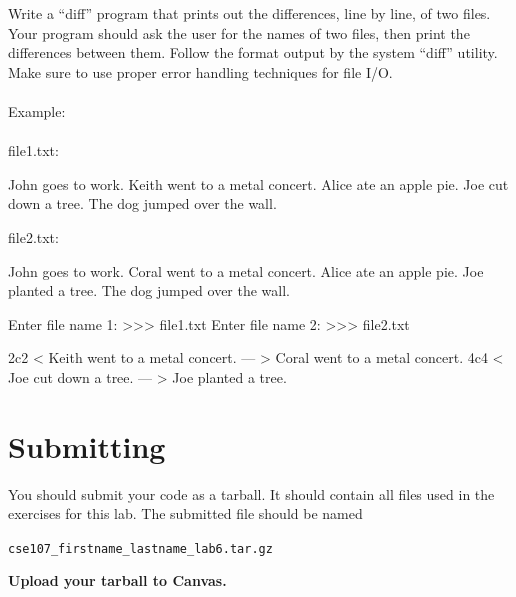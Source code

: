 \documentclass[11pt]{cselabheader}
\begin{document}
	\begin{ex}[diff.py]
		Write a ``diff'' program that prints out the differences, line by line, of two files.  Your program should ask the user for the names of two files, then print the differences between them.  Follow the format output by the system ``diff'' utility.  Make sure to use proper error handling techniques for file I/O.\\\\
		Example:\\\\
		file1.txt:
		\begin{pyconcode}
		John goes to work.
		Keith went to a metal concert.
		Alice ate an apple pie.
		Joe cut down a tree.
		The dog jumped over the wall.
		\end{pyconcode}
		file2.txt:
		\begin{pyconcode}
		John goes to work.
		Coral went to a metal concert.
		Alice ate an apple pie.
		Joe planted a tree.
		The dog jumped over the wall.
		\end{pyconcode}
		\begin{pyconcode}
		Enter file name 1: >>> file1.txt
		Enter file name 2: >>> file2.txt
		
		2c2
		< Keith went to a metal concert.
		---
		> Coral went to a metal concert.
		4c4
		< Joe cut down a tree.
		---
		> Joe planted a tree.
		\end{pyconcode}
	\end{ex}

\section{Submitting}

You should submit your code as a tarball. It should contain all files
used in the exercises for this lab. The submitted file should be named
\begin{center}
  \texttt{cse107\_firstname\_lastname\_lab6.tar.gz}
\end{center}

\begin{center}
  \textbf{Upload your tarball to Canvas.}
\end{center}

\listoftheorems
\end{document}
